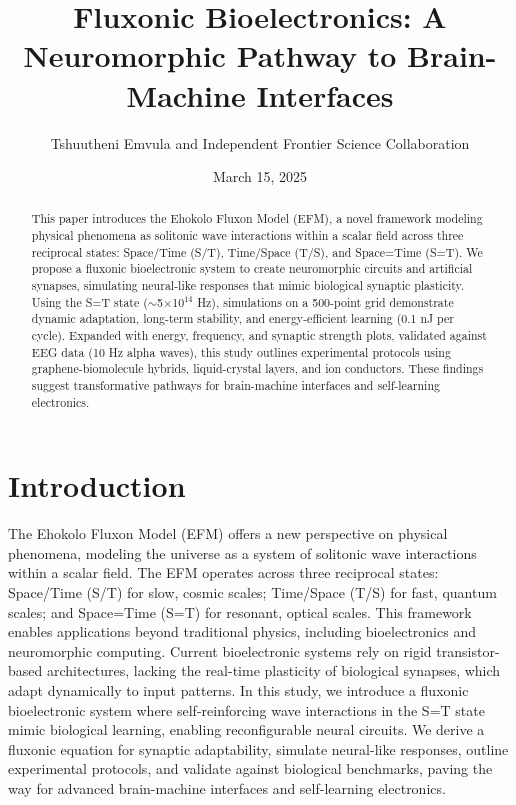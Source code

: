 \documentclass{article}
\title{Fluxonic Bioelectronics: A Neuromorphic Pathway to Brain-Machine Interfaces}
\author{Tshuutheni Emvula and Independent Frontier Science Collaboration}
\date{March 15, 2025}
\begin{document}
\maketitle

\begin{abstract}
This paper introduces the Ehokolo Fluxon Model (EFM), a novel framework modeling physical phenomena as solitonic wave interactions within a scalar field across three reciprocal states: Space/Time (S/T), Time/Space (T/S), and Space=Time (S=T). We propose a fluxonic bioelectronic system to create neuromorphic circuits and artificial synapses, simulating neural-like responses that mimic biological synaptic plasticity. Using the S=T state ($\sim$5$\times$10$^{14}$ Hz), simulations on a 500-point grid demonstrate dynamic adaptation, long-term stability, and energy-efficient learning (0.1 nJ per cycle). Expanded with energy, frequency, and synaptic strength plots, validated against EEG data (10 Hz alpha waves), this study outlines experimental protocols using graphene-biomolecule hybrids, liquid-crystal layers, and ion conductors. These findings suggest transformative pathways for brain-machine interfaces and self-learning electronics.
\end{abstract}

\section{Introduction}
The Ehokolo Fluxon Model (EFM) offers a new perspective on physical phenomena, modeling the universe as a system of solitonic wave interactions within a scalar field. The EFM operates across three reciprocal states: Space/Time (S/T) for slow, cosmic scales; Time/Space (T/S) for fast, quantum scales; and Space=Time (S=T) for resonant, optical scales. This framework enables applications beyond traditional physics, including bioelectronics and neuromorphic computing. Current bioelectronic systems rely on rigid transistor-based architectures, lacking the real-time plasticity of biological synapses, which adapt dynamically to input patterns. In this study, we introduce a fluxonic bioelectronic system where self-reinforcing wave interactions in the S=T state mimic biological learning, enabling reconfigurable neural circuits. We derive a fluxonic equation for synaptic adaptability, simulate neural-like responses, outline experimental protocols, and validate against biological benchmarks, paving the way for advanced brain-machine interfaces and self-learning electronics.
\end{document}
